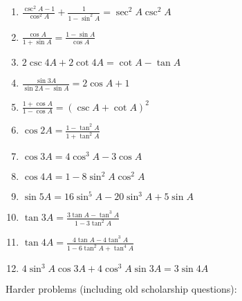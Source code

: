 \documentclass[../main.tex]{subfiles}
\begin{document}
\begin{enumerate}
    \item $\frac{\csc^2{A}-1}{\cos^2{A}}+\frac{1}{1-\sin^2{A}}=\sec^2{A}\csc^2{A}$
    
    \item $\frac{\cos{A}}{1+\sin{A}}=\frac{1-\sin{A}}{\cos{A}}$
    
    \item $2\csc{4A}+2\cot{4A}=\cot{A}-\tan{A}$
    
    \item $\frac{\sin{3A}}{\sin{2A}-\sin{A}}=2\cos{A}+1$
    
    \item $\frac{1+\cos{A}}{1-\cos{A}}=(\csc{A}+\cot{A})^2$
    
    \item $\cos{2A}=\frac{1-\tan^2{A}}{1+\tan^2{A}}$
    
    \item $\cos{3A}=4\cos^3{A}-3\cos{A}$
    
    \item $\cos{4A}=1-8\sin^2{A}\cos^2{A}$
    
    \item $\sin{5A}=16\sin^5{A}-20\sin^3{A}+5\sin{A}$
    
    \item $\tan{3A}=\frac{3\tan{A}-\tan^3{A}}{1-3\tan^2{A}}$
    
    \item $\tan{4A}=\frac{4\tan{A}-4\tan^3{A}}{1-6\tan^2{A}+\tan^4{A}}$
    
    \item $4\sin^3{A}\cos{3A}+4\cos^3{A}\sin{3A}=3\sin{4A}$


\end{enumerate}
Harder problems (including old scholarship questions):
\end{document}
